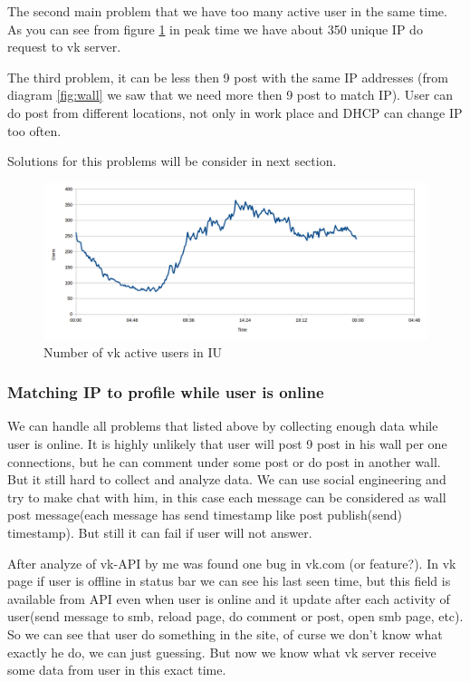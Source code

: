 The second main problem that we have too many active user in the same time. As you can see from figure \ref{fig:users} in peak time we have about 350 unique IP do request to vk server. 

The third problem, it can be less then 9 post with the same IP addresses (from diagram \ref{fig:wall} we saw that we need more then 9 post to match IP). User can do post from different locations, not only in work place and DHCP can change IP too often.

Solutions for this problems will be consider in next section.
\begin{figure}[H]
	\centering
		\includegraphics[width=180mm]{images/vk/users.png}
	\caption{Number of vk active users in IU}
	\label{fig:users}
\end{figure}
\subsubsection{Matching IP to profile while user is online}
We can handle all problems that listed above by collecting enough data while user is online. It is highly unlikely that user will post 9 post in his wall per one connections, but he can comment under some post or do post in another wall. But it still hard to collect and  analyze data. We can use social engineering and try to make chat with him, in this case each message can be considered as wall post message(each message has send timestamp like post publish(send) timestamp). But still it can fail if user will not answer. 

After analyze of vk-API by me was found one bug in vk.com (or feature?). In vk page if user is offline in status bar we can see his last seen time, but this field is available from API even when user is online and it update after each activity of user(send message to smb, reload page, do comment or post, open smb page, etc). So we can see that user do something in the site, of curse we don't know what exactly he do, we can just guessing. But now we know what vk server receive some data from user in this exact time.

